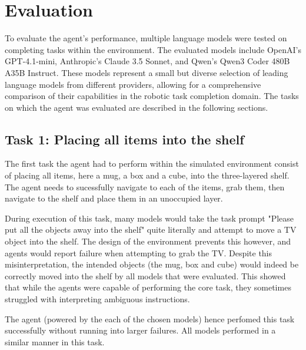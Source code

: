 \documentclass[../report.tex]{subfiles}
\begin{document}
\section{Evaluation}
\label{sec:evaluation}
To evaluate the agent's performance, multiple language models were tested on completing tasks within the environment. The evaluated models include OpenAI's GPT-4.1-mini, Anthropic's Claude 3.5 Sonnet, and Qwen's Qwen3 Coder 480B A35B Instruct. These models represent a small but diverse selection of leading language models from different providers, allowing for a comprehensive comparison of their capabilities in the robotic task completion domain. The tasks on which the agent was evaluated are described in the following sections.

\subsection{Task 1: Placing all items into the shelf}
The first task the agent had to perform within the simulated environment consist of placing all items, here a mug, a box and a cube, into the three-layered shelf. The agent needs to sucessfully navigate to each of the items, grab them, then navigate to the shelf and place them in an unoccupied layer.

During execution of this task, many models would take the task prompt "Please put all the objects away into the shelf" quite literally and attempt to move a TV object into the shelf. The design of the environment prevents this however, and agents would report failure when attempting to grab the TV. Despite this misinterpretation, the intended objects (the mug, box and cube) would indeed be correctly moved into the shelf by all models that were evaluated. This showed that while the agents were capable of performing the core task, they sometimes struggled with interpreting ambiguous instructions.

The agent (powered by the each of the chosen models) hence perfomed this task successfully without running into larger failures. All models performed in a similar manner in this task.
\end{document}
